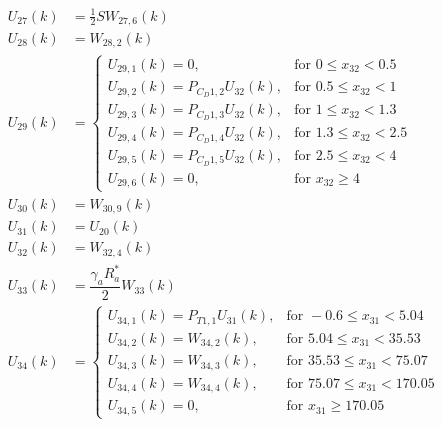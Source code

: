 \begin{align} \label{eq:allRecRel3}
\begin{split}
U_{27} \left(k\right)&= \frac{1}{2}SW_{27,6}\left(k\right) \\
U_{28} \left(k\right)&= W_{28,2}\left(k\right) \\
U_{29} \left(k\right)&=\begin{cases}
U_{29,1}\left(k\right)=0, & \text{for } 0\leq x_{32} < 0.5\\
U_{29,2}\left(k\right)=P_{C_{D} 1,2}U_{32}\left(k\right), &  \text{for } 0.5\leq x_{32} < 1 \\
U_{29,3}\left(k\right)=P_{C_{D} 1,3}U_{32}\left(k\right), &  \text{for } 1\leq x_{32} < 1.3 \\
U_{29,4}\left(k\right)=P_{C_{D} 1,4}U_{32}\left(k\right), &  \text{for } 1.3\leq x_{32} < 2.5 \\
U_{29,5}\left(k\right)=P_{C_{D} 1,5}U_{32}\left(k\right), &  \text{for } 2.5\leq x_{32} < 4 \\
U_{29,6}\left(k\right)=0, &  \text{for } x_{32} \geq 4 
\end{cases}\\
U_{30} \left(k\right)&=W_{30,9}\left(k\right) \\
U_{31} \left(k\right)&= U_{20}\left(k\right)\\
U_{32} \left(k\right)&= W_{32,4}\left(k\right)\\
U_{33} \left(k\right)&= \dfrac{\gamma_{a}R_{a}^{*}}{2}W_{33}\left(k\right) \\
U_{34}\left(k\right)&=\begin{cases}
U_{34,1}\left(k\right)=P_{T 1,1}U_{31}\left(k\right), & \text{for } -0.6 \leq x_{31} < 5.04  \\
U_{34,2}\left(k\right)=W_{34,2}\left(k\right), &  \text{for } 5.04\leq x_{31} < 35.53   \\
U_{34,3}\left(k\right)=W_{34,3}\left(k\right), &  \text{for } 35.53\leq x_{31} < 75.07   \\
U_{34,4}\left(k\right)=W_{34,4}\left(k\right), &  \text{for } 75.07\leq x_{31} < 170.05   \\
U_{34,5}\left(k\right)=0, &  \text{for }  x_{31} \geq 170.05   
\end{cases}
\end{split}
\end{align}

